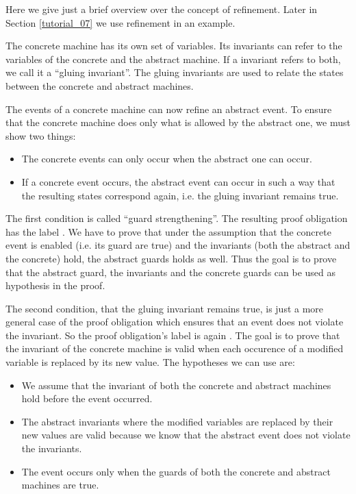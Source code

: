Here we give just a brief overview over the concept of refinement. Later in Section \ref{tutorial_07}
we use refinement in an example.

The concrete machine has its own set of variables. Its invariants can refer to
the variables of the concrete and the abstract machine. If a invariant refers to both,
we call it a ``gluing invariant''. The gluing invariants are
used to relate the states between the concrete and abstract machines.

The events of a concrete machine can now refine an abstract event. To ensure that the concrete machine 
does only what is allowed by the abstract one, we must show two things:
\begin{itemize}
\item The concrete events can only occur when the abstract one can occur.
\item If a concrete event occurs, the abstract event can occur in such a way that the resulting
  states correspond again, i.e. the gluing invariant remains true.
\end{itemize}

The first condition is called ``guard strengthening''. The resulting proof obligation has the label
. We have to prove that under the assumption that the
concrete event is enabled (i.e. its guard are true) and the invariants (both the abstract and the concrete) 
hold, the abstract guards holds as well. Thus the goal is to prove that the abstract guard, the invariants and the
concrete guards can be used as hypothesis in the proof.

The second condition, that the gluing invariant remains true, is just a more general case of the proof obligation which ensures 
that an event does not violate the invariant. So the proof obligation's label is again 
. The goal is to prove that the invariant of the concrete machine is valid when each occurence of a modified variable is replaced by its new value.
The hypotheses we can use are:
\begin{itemize}
\item We assume that the invariant of both the concrete and abstract machines hold before the event occurred.
\item The abstract invariants where the modified variables are replaced by their new values are valid because we know that the abstract event does not violate the invariants.
\item The event occurs only when the guards of both the concrete and abstract machines are true.
\end{itemize}

